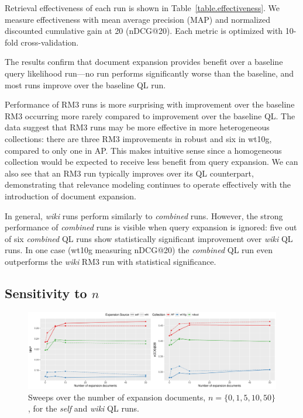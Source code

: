 \documentclass[sigconf]{acmart}
\begin{document}
Retrieval effectiveness of each run is shown in Table~\ref{table.effectiveness}. We measure effectiveness with mean average precision (MAP) and normalized discounted cumulative gain at 20 (nDCG@20). Each metric is optimized with 10-fold cross-validation.

The results confirm that document expansion provides benefit over a baseline query likelihood run---no run performs significantly worse than the baseline, and most runs improve over the baseline QL run. %

Performance of RM3 runs is more surprising with improvement over the baseline RM3 occurring more rarely compared to improvement over the baseline QL. The data suggest that RM3 runs may be more effective in more heterogeneous collections: there are three RM3 improvements in robust and six in wt10g, compared to only one in AP. This makes intuitive sense since a homogeneous collection would be expected to receive less benefit from query expansion. We can also see that an RM3 run typically improves over its QL counterpart, demonstrating that relevance modeling continues to operate effectively with the introduction of document expansion.

In general, \textit{wiki} runs perform similarly to \textit{combined} runs. However, the strong performance of \textit{combined} runs is visible when query expansion is ignored: five out of six \textit{combined} QL runs show statistically significant improvement over \textit{wiki} QL runs. In one case (wt10g measuring nDCG@20) the \textit{combined} QL run even outperforms the \textit{wiki} RM3 run with statistical significance.


\subsection{Sensitivity to \boldmath$n$}\label{section.n-sensitivity}

\begin{figure}
\centering
\includegraphics[width=0.76\linewidth]{figures/expansion-sweep.pdf}
\caption{Sweeps over the number of expansion documents, $n = \{0, 1, 5, 10, 50\}$, for the \textit{self} and \textit{wiki} QL runs.}
\label{figure.n-sweeps}
\end{figure}
\end{document}
